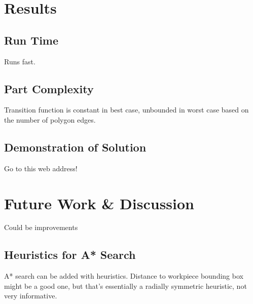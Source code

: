 \section{Results}

	\subsection{Run Time}

Runs fast.

	\subsection{Part Complexity}

Transition function is constant in best case, unbounded in worst case based on the number of polygon edges.

	\subsection{Demonstration of Solution}

Go to this web address!

\section{Future Work \& Discussion}

Could be improvements

	\subsection{Heuristics for A* Search}

A* search can be added with heuristics. Distance to workpiece bounding box might be a good one, but that's essentially a radially symmetric heuristic, not very informative.
